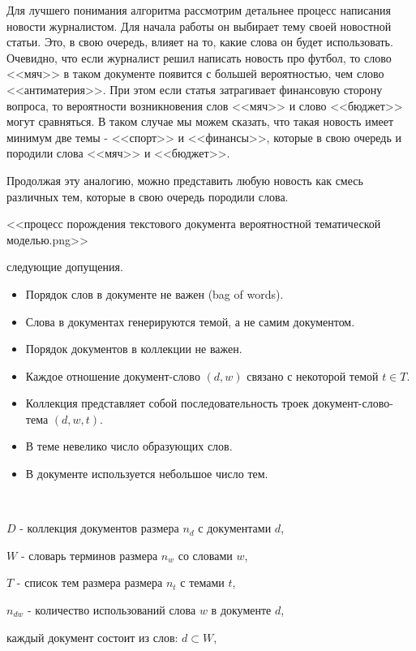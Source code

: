 Для лучшего понимания алгоритма рассмотрим детальнее процесс написания новости журналистом. Для начала работы он выбирает тему своей новостной статьи. Это, в свою очередь, влияет на то, какие слова он будет использовать. Очевидно, что если журналист решил написать новость про футбол, то слово <<мяч>> в таком документе появится с большей вероятностью, чем слово <<антиматерия>>. При этом если статья затрагивает финансовую сторону вопроса, то вероятности возникновения слов <<мяч>> и слово <<бюджет>> могут сравняться. В таком случае мы можем сказать,  что такая новость имеет минимум две темы - <<спорт>> и <<финансы>>, которые в свою очередь и породили слова <<мяч>> и <<бюджет>>. 

Продолжая эту аналогию, можно представить любую новость как смесь различных тем, которые в свою очередь породили слова. 

<<процесс порождения текстового документа вероятностной тематической моделью.png>>

 следующие допущения.

\begin{itemize}
    \item Порядок слов в документе не важен (bag of words).
    \item Слова в документах генерируются темой, а не самим документом.
    \item Порядок документов в коллекции не важен.
    \item Каждое отношение документ-слово $(d,w)$ связано с некоторой темой $t \in T$.
    \item Коллекция представляет собой последовательность троек документ-слово-тема $(d,w,t)$.
    \item В теме невелико число образующих слов.
    \item В документе используется небольшое число тем.
\end{itemize}

~\



 $D$ - коллекция документов размера $n_d$ с документами $d$,

 $W$ - словарь терминов размера $n_w$ со словами $w$,

 $T$ - список тем размера размера $n_t$ с темами $t$,

 $n_{dw}$ - количество использований слова $w$ в документе $d$,

 каждый документ состоит из слов: $d \subset W$,

